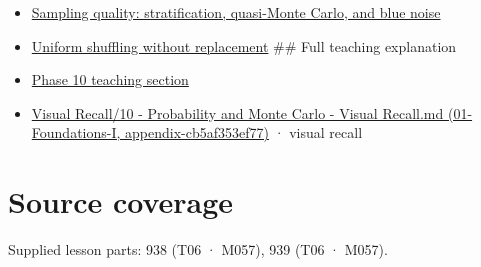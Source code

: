 \begin{itemize}
\item
  \hyperref[appendix-9f693ffd82bc]{Sampling quality: stratification, quasi-Monte Carlo, and blue noise}
\item
  \hyperref[appendix-184fcc411663]{Uniform shuffling without replacement} \#\# Full teaching explanation
\item
  \href{Continuous\%20Notes/Computing\%20Foundations\%20-\%20From\%20Bits\%20to\%20C++\%20and\%20Systems\%20APIs\#6.\%20A\%20computer\%20produces\%20deterministic\%20pseudorandom\%20sequences}{Phase 10 teaching section}
\item
  \href{../01-Foundations-I/main.pdf\#nameddest=appendix-cb5af353ef77}{Visual Recall/10 - Probability and Monte Carlo - Visual Recall.md (01-Foundations-I, appendix-cb5af353ef77)} · visual recall
\end{itemize}

\section{Source coverage}\label{appendix-daaf25bfd3a0-source-coverage}

Supplied lesson parts: 938 (T06 · M057), 939 (T06 · M057).
